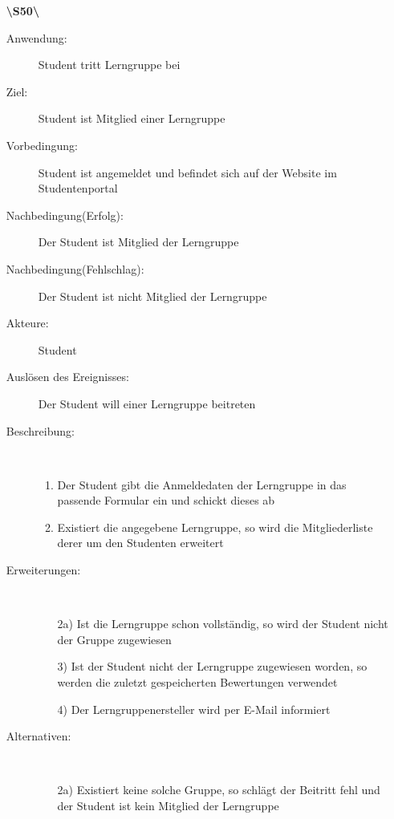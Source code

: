 \documentclass[parskip=full]{scrartcl}
\begin{document}
\begin{enumerate}
  \item[\textbf{\textbackslash S50\textbackslash}] \begin{description}
  \item[Anwendung:] Student tritt Lerngruppe bei
  \item[Ziel:] Student ist Mitglied einer Lerngruppe
  	\item[Vorbedingung:] Student ist angemeldet und befindet sich auf der Website im Studentenportal
  	\item[Nachbedingung(Erfolg):] Der Student ist Mitglied der Lerngruppe
  	\item[Nachbedingung(Fehlschlag):] Der Student ist nicht Mitglied der
  	Lerngruppe
  	\item[Akteure:] Student
  	\item[Auslösen des Ereignisses:] Der Student will einer Lerngruppe beitreten
  	\item[Beschreibung:]~
  	\begin{enumerate}[1.]
  	  \item Der Student gibt die Anmeldedaten der Lerngruppe in das passende
  	  Formular ein und schickt dieses ab
  	  \item Existiert die angegebene Lerngruppe, so wird die Mitgliederliste
  	  derer um den Studenten erweitert
  	\end{enumerate}
  	\item[Erweiterungen:]~
  	\begin{enumerate}
  	  \item[2a)] Ist die Lerngruppe schon vollständig, so wird der Student nicht
  	  der Gruppe zugewiesen
  	  \item[3)] Ist der Student nicht der Lerngruppe zugewiesen worden, so werden
  	  die zuletzt gespeicherten Bewertungen verwendet
  	  \item[4)] Der Lerngruppenersteller wird per E-Mail informiert
  	 \end{enumerate}
  	\item[Alternativen:] ~
  	\begin{enumerate}
  	  \item[2a)] Existiert keine solche Gruppe, so schlägt der Beitritt fehl und
  	  der Student ist kein Mitglied der Lerngruppe
  	 \end{enumerate}  
  \end{description}
  \pagebreak
  

\end{enumerate}
\end{document}
